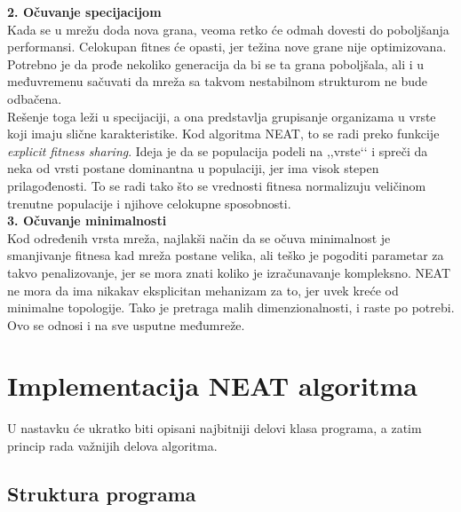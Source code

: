 \documentclass[a4paper]{article}
\begin{document}
\noindent
\label{specijacija}
\textbf{2. Očuvanje specijacijom} \\
\indent
Kada se u mrežu doda nova grana, veoma retko će odmah dovesti do poboljšanja performansi. Celokupan fitnes će opasti, jer težina nove grane nije optimizovana. Potrebno je da prođe nekoliko generacija da bi se ta grana poboljšala, ali i u međuvremenu sačuvati da mreža sa takvom nestabilnom strukturom ne bude odbačena.\\
Rešenje toga leži u specijaciji, a ona predstavlja grupisanje organizama u vrste koji imaju slične karakteristike. Kod algoritma NEAT, to se radi preko funkcije \emph{explicit fitness sharing}. Ideja je da se populacija podeli na ,,vrste‘‘ i spreči da neka od vrsti postane dominantna u populaciji, jer ima visok stepen prilagođenosti. To se radi tako što se vrednosti fitnesa normalizuju veličinom trenutne populacije i njihove celokupne sposobnosti. \\

\noindent
\label{specijacija}
\textbf{3. Očuvanje minimalnosti} \\
\indent
Kod određenih vrsta mreža, najlakši način da se očuva minimalnost je smanjivanje fitnesa kad mreža postane velika, ali teško je pogoditi parametar za takvo penalizovanje, jer se mora znati koliko je izračunavanje kompleksno. NEAT ne mora da ima nikakav eksplicitan mehanizam za to, jer uvek kreće od minimalne topologije. Tako je pretraga malih dimenzionalnosti, i raste po potrebi. Ovo se odnosi i na sve usputne međumreže.

\section{Implementacija NEAT algoritma}
\label{implementacija}

U nastavku će ukratko biti opisani najbitniji delovi klasa programa, a zatim princip rada važnijih delova algoritma.

\subsection{Struktura programa}
\label{struktura}
\end{document}
